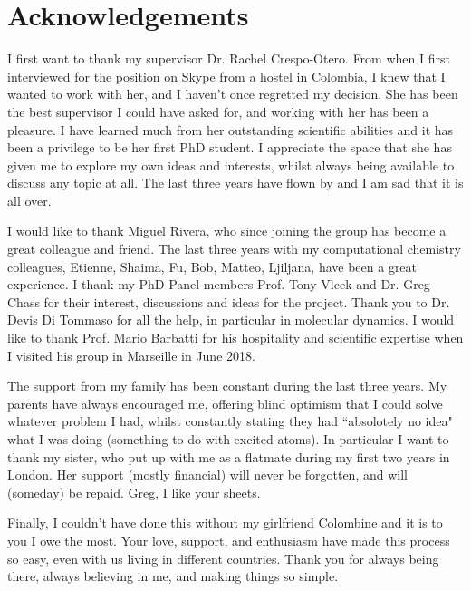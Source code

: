 \chapter*{Acknowledgements}
I first want to thank my supervisor Dr. Rachel Crespo-Otero. From when I first interviewed for the position on Skype from a hostel in Colombia, I knew that I wanted to work with her, and I haven't once regretted my decision. She has been the best supervisor I could have asked for, and working with her has been a pleasure. I have learned much from her outstanding scientific abilities and it has been a privilege to be her first PhD student. I appreciate the space that she has given me to explore my own ideas and interests, whilst always being available to discuss any topic at all. The last three years have flown by and I am sad that it is all over. 

I would like to thank Miguel Rivera, who since joining the group has become a great colleague and friend. The last three years with my computational chemistry colleagues, Etienne, Shaima, Fu, Bob, Matteo, Ljiljana, have been a great experience. I thank my PhD Panel members Prof. Tony Vlcek and Dr. Greg Chass for their interest, discussions and ideas for the project. Thank you to Dr. Devis Di Tommaso for all the help, in particular in molecular dynamics. I would like to thank Prof. Mario Barbatti for his hospitality and scientific expertise when I visited his group in Marseille in June 2018.

The support from my family has been constant during the last three years. My parents have always encouraged me, offering blind optimism that I could solve whatever problem I had, whilst constantly stating they had ``absolotely no idea" what I was doing (something to do with excited atoms). In particular I want to thank my sister, who put up with me as a flatmate during my first two years in London. Her support (mostly financial) will never be forgotten, and will (someday) be repaid. Greg, I like your sheets. 

Finally, I couldn't have done this without my girlfriend Colombine and it is to you I owe the most. Your love, support, and enthusiasm have made this process so easy, even with us living in different countries. Thank you for always being there, always believing in me, and making things so simple. 
